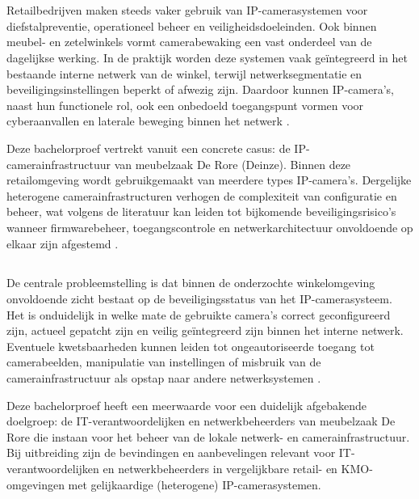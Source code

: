 
\chapter{}%
\label{ch:inleiding}

Retailbedrijven maken steeds vaker gebruik van IP-camerasystemen voor diefstalpreventie, operationeel beheer en veiligheidsdoeleinden. Ook binnen meubel- en zetelwinkels vormt camerabewaking een vast onderdeel van de dagelijkse werking. In de praktijk worden deze systemen vaak geïntegreerd in het bestaande interne netwerk van de winkel, terwijl netwerksegmentatie en beveiligingsinstellingen beperkt of afwezig zijn. Daardoor kunnen IP-camera’s, naast hun functionele rol, ook een onbedoeld toegangspunt vormen voor cyberaanvallen en laterale beweging binnen het netwerk \parencite{ENISA2024ThreatLandscape,Naprys2024Dahua}.

Deze bachelorproef vertrekt vanuit een concrete casus: de IP-camerainfrastructuur van meubelzaak De Rore (Deinze). Binnen deze retailomgeving wordt gebruikgemaakt van meerdere types IP-camera’s. Dergelijke heterogene camerainfrastructuren verhogen de complexiteit van configuratie en beheer, wat volgens de literatuur kan leiden tot bijkomende beveiligingsrisico’s wanneer firmwarebeheer, toegangscontrole en netwerkarchitectuur onvoldoende op elkaar zijn afgestemd \parencite{Butun2019arXivIoTSecurity}.

\section{}%
\label{sec:probleemstelling}

De centrale probleemstelling is dat binnen de onderzochte winkelomgeving onvoldoende zicht bestaat op de beveiligingsstatus van het IP-camerasysteem. Het is onduidelijk in welke mate de gebruikte camera’s correct geconfigureerd zijn, actueel gepatcht zijn en veilig geïntegreerd zijn binnen het interne netwerk. Eventuele kwetsbaarheden kunnen leiden tot ongeautoriseerde toegang tot camerabeelden, manipulatie van instellingen of misbruik van de camerainfrastructuur als opstap naar andere netwerksystemen \parencite{Butun2019arXivIoTSecurity}.

Deze bachelorproef heeft een meerwaarde voor een duidelijk afgebakende doelgroep: de IT-verantwoordelijken en netwerkbeheerders van meubelzaak De Rore die instaan voor het beheer van de lokale netwerk- en camerainfrastructuur. Bij uitbreiding zijn de bevindingen en aanbevelingen relevant voor IT-verantwoordelijken en netwerkbeheerders in vergelijkbare retail- en KMO-omgevingen met gelijkaardige (heterogene) IP-camerasystemen.

